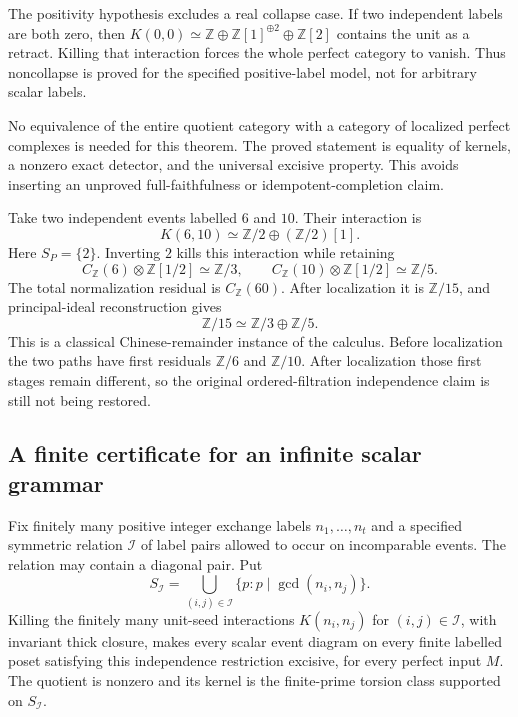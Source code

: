 The positivity hypothesis excludes a real collapse case. If two independent labels are both zero, then $K(0,0)\simeq\mathbb Z\oplus\mathbb Z[1]^{\oplus2}\oplus\mathbb Z[2]$ contains the unit as a retract. Killing that interaction forces the whole perfect category to vanish. Thus noncollapse is proved for the specified positive-label model, not for arbitrary scalar labels.

No equivalence of the entire quotient category with a category of localized perfect complexes is needed for this theorem. The proved statement is equality of kernels, a nonzero exact detector, and the universal excisive property. This avoids inserting an unproved full-faithfulness or idempotent-completion claim.

\begin{example}\label{ex:six-ten}
Take two independent events labelled $6$ and $10$. Their interaction is
\[
 K(6,10)\simeq\mathbb Z/2\oplus(\mathbb Z/2)[1].
\]
Here $S_P=\{2\}$. Inverting $2$ kills this interaction while retaining
\[
 C_{\mathbb Z}(6)\otimes\mathbb Z[1/2]\simeq\mathbb Z/3,
 \qquad
 C_{\mathbb Z}(10)\otimes\mathbb Z[1/2]\simeq\mathbb Z/5.
\]
The total normalization residual is $C_{\mathbb Z}(60)$. After localization it is $\mathbb Z/15$, and principal-ideal reconstruction gives
\[
 \mathbb Z/15\simeq\mathbb Z/3\oplus\mathbb Z/5.
\]
This is a classical Chinese-remainder instance of the calculus. Before localization the two paths have first residuals $\mathbb Z/6$ and $\mathbb Z/10$. After localization those first stages remain different, so the original ordered-filtration independence claim is still not being restored.
\end{example}

\subsection{A finite certificate for an infinite scalar grammar}

\begin{corollary}\label{cor:finite-signature}
Fix finitely many positive integer exchange labels $n_1,\ldots,n_t$ and a specified symmetric relation $\mathcal I$ of label pairs allowed to occur on incomparable events. The relation may contain a diagonal pair. Put
\[
 S_{\mathcal I}=\bigcup_{(i,j)\in\mathcal I}
 \{p:p\mid\gcd(n_i,n_j)\}.
\]
Killing the finitely many unit-seed interactions $K(n_i,n_j)$ for $(i,j)\in\mathcal I$, with invariant thick closure, makes every scalar event diagram on every finite labelled poset satisfying this independence restriction excisive, for every perfect input $M$. The quotient is nonzero and its kernel is the finite-prime torsion class supported on $S_{\mathcal I}$.
\end{corollary}

